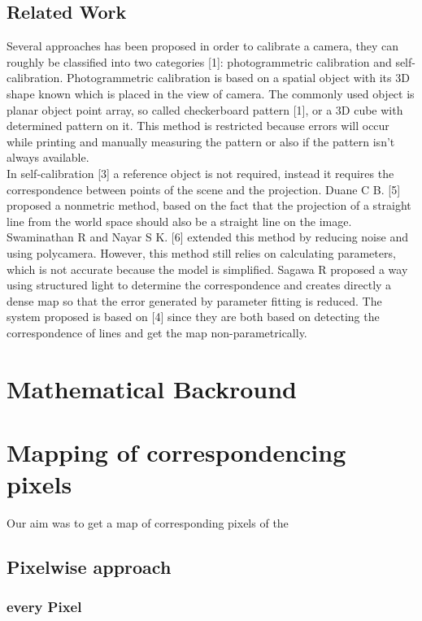 \documentclass[journal,final,a4paper,twoside]{PS}
\begin{document}
\subsection{Related Work}
\label{sec:related}
Several approaches has been proposed in order to calibrate a camera, they can roughly be classified into two categories [1]: photogrammetric calibration and self-calibration.
Photogrammetric calibration is based on a spatial object with its 3D shape known which is placed in the view of camera. The commonly used object is planar object point array, so called checkerboard pattern [1], or a 3D cube with determined pattern on it. This method is restricted because errors will occur while printing and manually measuring the pattern or also if the pattern isn't always available.\\
In self-calibration [3] a reference object is not required, instead it requires the correspondence between points of the scene and the projection. Duane C B. [5] proposed a nonmetric method, based on the fact that the projection of a straight line from the world space should also be a straight line on the image. Swaminathan R and Nayar S K. [6] extended this method by reducing noise and using polycamera. However, this method still relies on calculating parameters, which is not accurate because the model is simplified. 
Sagawa R  proposed a way using structured light to determine the correspondence and creates directly a dense map so that the error generated by parameter fitting is reduced. 
The system proposed is based on [4] since they are both based on detecting the correspondence of lines and get the map non-parametrically. \cite{Faugeras}

\section{Mathematical Backround}
\label{sec:maths}

\section{Mapping of correspondencing pixels}
\label{sec:mapping}
Our aim was to get a map of corresponding pixels of the 

\subsection{Pixelwise approach}
\subsubsection{every Pixel}
\end{document}
